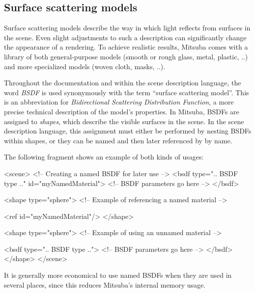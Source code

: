 \subsection{Surface scattering models}
Surface scattering models describe the way in which light reflects
from surfaces in the scene. Even slight adjustments to such a description
can significantly change the appearance of a rendering.
To achieve realistic results, Mitsuba comes with a library of 
both general-purpose models (smooth or rough glass, metal, plastic, ..) and 
more specialized models (woven cloth, masks, ..).

Throughout the documentation and within the scene description language, 
the word \emph{BSDF} is used synonymously with the term ``surface
scattering model''. This is an abbreviation for 
\emph{Bidirectional Scattering Distribution Function}, a more 
precise technical description of the model's properties.
In Mitsuba, BSDFs are assigned to \emph{shapes}, which
describe the visible surfaces in the scene. In the scene 
description language, this assignment must
either be performed by nesting BSDFs within shapes, 
or they can be named and then later referenced 
by by name.

The following fragment shows an example of both kinds of usages:
\begin{xml}
<scene>
	<!-- Creating a named BSDF for later use -->
	<bsdf type=".. BSDF type .." id="myNamedMaterial">
		<!-- BSDF parameters go here -->
	</bsdf>

	<shape type="sphere">
		<!-- Example of referencing a named material -->

		<ref id="myNamedMaterial"/>
	</shape>

	<shape type="sphere">
		<!-- Example of using an unnamed material -->

		<bsdf type=".. BSDF type ..">
			<!-- BSDF parameters go here -->
		</bsdf>
	</shape>
</scene>
\end{xml}
It is generally more economical to use named BSDFs when they
are used in several places, since this reduces Mitsuba's internal
memory usage.
